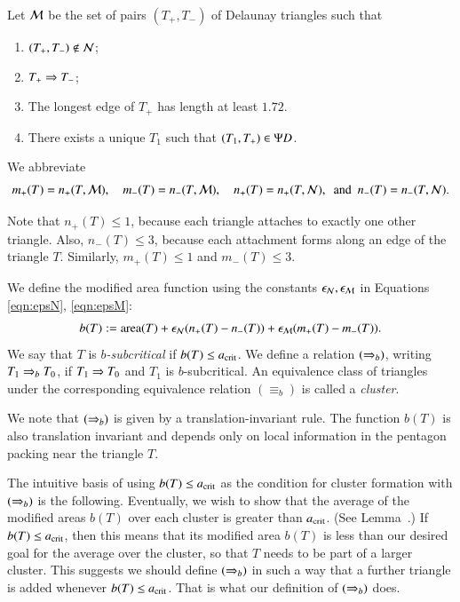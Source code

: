 Let $\mathcal M$ be the set of pairs $(T_+,T_-)$ of Delaunay triangles such that
\begin{enumerate}
\item $(T_+,T_-)\not\in \mathcal N$;
\item $T_+\Rightarrow T_-$;
\item The longest edge of $T_+$ has length  at least $1.72$.
\item There exists a unique $T_1$ such that $(T_1,T_+)\in \Psi D$.
\end{enumerate}

We abbreviate 
\[
m_+(T) = n_+(T,\M), 
\quad m_-(T) = n_-(T,\M), 
\quad n_+(T) =n_+(T,\N), 
\ \text{ and } \ 
n_-(T) = n_-(T,\N).
\]

\begin{remark}
  Note  that $n_+(T)\le 1$, because each triangle attaches to
  exactly one other triangle.  Also, $n_-(T)\le 3$, because each
  attachment forms along an edge of the triangle $T$.  Similarly,
  $m_+(T)\le 1$ and $m_-(T)\le 3$.
\end{remark}

We define the modified area function using the constants $\epsilon_{\mathcal N},\epsilon_{\mathcal M}$
in Equations \eqref{eqn:epsN}, \eqref{eqn:epsM}:
\begin{equation}
b(T) := {\operatorname{area}}(T) + \epsilon_{\mathcal N} (n_+(T) - n_-(T)) + \epsilon_{\mathcal M} (m_+(T) - m_-(T)).
\end{equation}
We say that $T$ is {\it $b$-subcritical} if $b(T) \le a_\text{crit}$.  We define
a relation $(\Rightarrow_{b})$, writing
$T_1\Rightarrow_{b} T_0$, if $T_1\Rightarrow T_0$ and $T_1$ is $b$-subcritical.  An
equivalence class of triangles under the corresponding equivalence
relation $(\equiv_b)$ is called a {\it cluster}.

We note that $(\Rightarrow_{b})$ is given by a translation-invariant rule.  The
function $b(T)$ is also translation invariant and depends only on
local information in the pentagon packing near the triangle $T$.

The intuitive basis of using $b(T)\le a_\text{crit}$ as the condition for
cluster formation with $(\Rightarrow_{b})$ is the following.  Eventually, we wish
to show that the average of the modified areas $b(T)$ over each
cluster is greater than $a_\text{crit}$.  (See Lemma~.)  If
$b(T)\le a_\text{crit}$, then this means that its modified area $b(T)$ is
less than our desired goal for the average over the cluster, so that
$T$ needs to be part of a larger cluster.  This suggests we should
define $(\Rightarrow_{b})$ in such a way that a further triangle is added
whenever $b(T)\le a_\text{crit}$. That is what our definition of $(\Rightarrow_{b})$
does.

